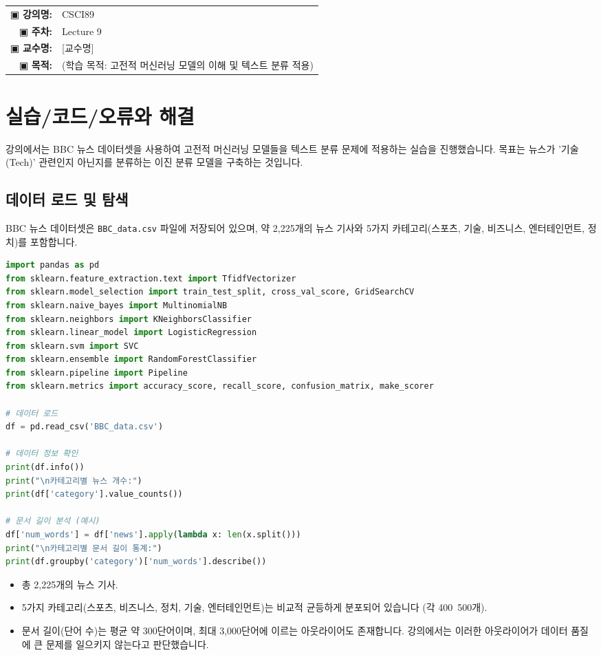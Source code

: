 \documentclass[11pt,a4paper]{article}
\makeatletter
\theoremstyle{definition}
\newcommand{\metainfo}[4]{
\begin{tcolorbox}[
    colback=lightpurple,
    colframe=darkpurple,
    boxrule=1pt,
    arc=2mm,
    left=10pt,
    right=10pt,
    top=8pt,
    bottom=8pt
]
\begin{tabular}{@{}rl@{}}
▣ \textbf{강의명:} & #1 \\[0.3em]
▣ \textbf{주차:} & #2 \\[0.3em]
▣ \textbf{교수명:} & #3 \\[0.3em]
▣ \textbf{목적:} & \begin{minipage}[t]{0.75\textwidth}#4\end{minipage}
\end{tabular}
\end{tcolorbox}
}
\makeatother
\begin{document}
\newpage

\thispagestyle{firstpage}

\metainfo{CSCI89}{Lecture 9}{[교수명]}{(학습 목적: 고전적 머신러닝 모델의 이해 및 텍스트 분류 적용)}

\tableofcontents

\newpage

\section*{실습/코드/오류와 해결}

강의에서는 BBC 뉴스 데이터셋을 사용하여 고전적 머신러닝 모델들을 텍스트 분류 문제에 적용하는 실습을 진행했습니다. 목표는 뉴스가 '기술(Tech)' 관련인지 아닌지를 분류하는 이진 분류 모델을 구축하는 것입니다.

\subsection{데이터 로드 및 탐색}

BBC 뉴스 데이터셋은 \texttt{BBC\_data.csv} 파일에 저장되어 있으며, 약 2,225개의 뉴스 기사와 5가지 카테고리(스포츠, 기술, 비즈니스, 엔터테인먼트, 정치)를 포함합니다.

\begin{lstlisting}[language=Python, caption=데이터 로드 및 정보 확인, label=lst:data_load]
import pandas as pd
from sklearn.feature_extraction.text import TfidfVectorizer
from sklearn.model_selection import train_test_split, cross_val_score, GridSearchCV
from sklearn.naive_bayes import MultinomialNB
from sklearn.neighbors import KNeighborsClassifier
from sklearn.linear_model import LogisticRegression
from sklearn.svm import SVC
from sklearn.ensemble import RandomForestClassifier
from sklearn.pipeline import Pipeline
from sklearn.metrics import accuracy_score, recall_score, confusion_matrix, make_scorer

# 데이터 로드
df = pd.read_csv('BBC_data.csv')

# 데이터 정보 확인
print(df.info())
print("\n카테고리별 뉴스 개수:")
print(df['category'].value_counts())

# 문서 길이 분석 (예시)
df['num_words'] = df['news'].apply(lambda x: len(x.split()))
print("\n카테고리별 문서 길이 통계:")
print(df.groupby('category')['num_words'].describe())
\end{lstlisting}

\begin{infobox}[title={데이터 탐색 결과}]
\begin{itemize}
    \item 총 2,225개의 뉴스 기사.
    \item 5가지 카테고리(스포츠, 비즈니스, 정치, 기술, 엔터테인먼트)는 비교적 균등하게 분포되어 있습니다 (각 400~500개).
    \item 문서 길이(단어 수)는 평균 약 300단어이며, 최대 3,000단어에 이르는 아웃라이어도 존재합니다. 강의에서는 이러한 아웃라이어가 데이터 품질에 큰 문제를 일으키지 않는다고 판단했습니다.
\end{itemize}
\end{infobox}
\end{document}

